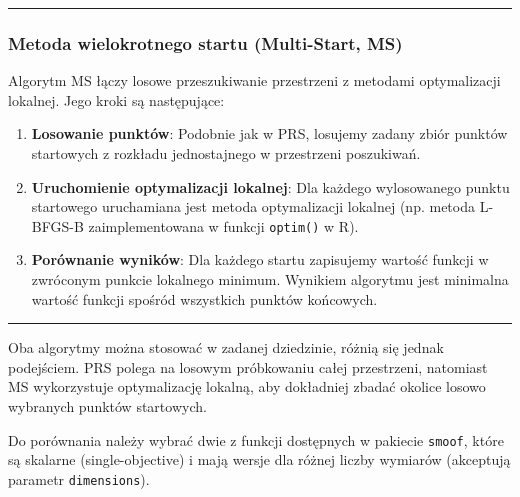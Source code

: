 \documentclass[
]{article}
\begin{document}
\begin{center}\rule{0.5\linewidth}{0.5pt}\end{center}

\subsubsection{Metoda wielokrotnego startu (Multi-Start,
MS)}\label{metoda-wielokrotnego-startu-multi-start-ms}

Algorytm MS łączy losowe przeszukiwanie przestrzeni z metodami
optymalizacji lokalnej. Jego kroki są następujące:

\begin{enumerate}
\def\labelenumi{\arabic{enumi}.}
\item
  \textbf{Losowanie punktów}: Podobnie jak w PRS, losujemy zadany zbiór
  punktów startowych z rozkładu jednostajnego w przestrzeni poszukiwań.
\item
  \textbf{Uruchomienie optymalizacji lokalnej}: Dla każdego wylosowanego
  punktu startowego uruchamiana jest metoda optymalizacji lokalnej (np.
  metoda L-BFGS-B zaimplementowana w funkcji \texttt{optim()} w R).
\item
  \textbf{Porównanie wyników}: Dla każdego startu zapisujemy wartość
  funkcji w zwróconym punkcie lokalnego minimum. Wynikiem algorytmu jest
  minimalna wartość funkcji spośród wszystkich punktów końcowych.
\end{enumerate}

\begin{center}\rule{0.5\linewidth}{0.5pt}\end{center}

Oba algorytmy można stosować w zadanej dziedzinie, różnią się jednak
podejściem. PRS polega na losowym próbkowaniu całej przestrzeni,
natomiast MS wykorzystuje optymalizację lokalną, aby dokładniej zbadać
okolice losowo wybranych punktów startowych.

Do porównania należy wybrać dwie z funkcji dostępnych w pakiecie
\texttt{smoof}, które są skalarne (single-objective) i mają wersje dla
różnej liczby wymiarów (akceptują parametr \texttt{dimensions}).
\end{document}
